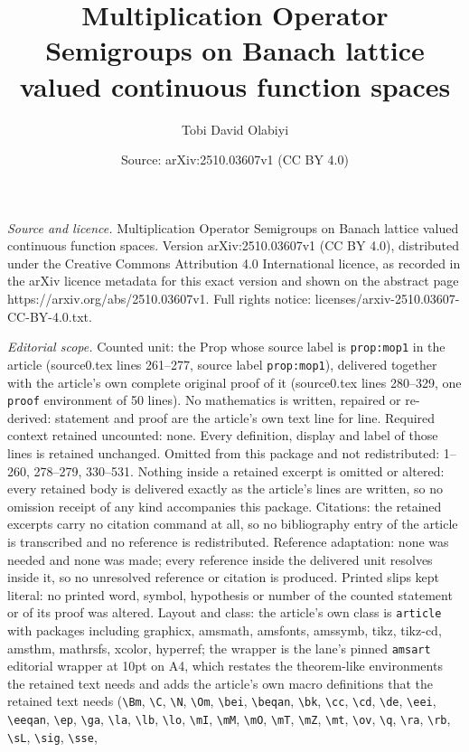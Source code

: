 \documentclass[10pt,a4paper]{amsart}
\title[Multiplication Operator Semigroups on Banach lattice valued ]{Multiplication Operator Semigroups on Banach lattice valued continuous function spaces}
\author{Tobi David Olabiyi}
\date{Source: arXiv:2510.03607v1 (CC BY 4.0)}
\begin{document}
\maketitle

\noindent\emph{Source and licence.} Multiplication Operator Semigroups on Banach lattice valued continuous function spaces. Version arXiv:2510.03607v1 (CC BY 4.0), distributed under the Creative Commons Attribution 4.0 International licence, as recorded in the arXiv licence metadata for this exact version and shown on the abstract page https://arxiv.org/abs/2510.03607v1. Full rights notice: licenses/arxiv-2510.03607-CC-BY-4.0.txt.\par\smallskip

\noindent\textit{Editorial scope.} Counted unit: the Prop whose source label is \texttt{prop:mop1} in the article (source0.tex lines 261--277, source label \texttt{prop:mop1}), delivered together with the article's own complete original proof of it (source0.tex lines 280--329, one \texttt{proof} environment of 50 lines). No mathematics is written, repaired or re-derived: statement and proof are the article's own text line for line. Required context retained uncounted: none. Every definition, display and label of those lines is retained unchanged. Omitted from this package and not redistributed: 1--260, 278--279, 330--531. Nothing inside a retained excerpt is omitted or altered: every retained body is delivered exactly as the article's lines are written, so no omission receipt of any kind accompanies this package. Citations: the retained excerpts carry no citation command at all, so no bibliography entry of the article is transcribed and no reference is redistributed. Reference adaptation: none was needed and none was made; every reference inside the delivered unit resolves inside it, so no unresolved reference or citation is produced. Printed slips kept literal: no printed word, symbol, hypothesis or number of the counted statement or of its proof was altered. Layout and class: the article's own class is \texttt{article} with packages including graphicx, amsmath, amsfonts, amssymb, tikz, tikz-cd, amsthm, mathrsfs, xcolor, hyperref; the wrapper is the lane's pinned \texttt{amsart} editorial wrapper at 10pt on A4, which restates the theorem-like environments the retained text needs and adds the article's own macro definitions that the retained text needs (\texttt{\textbackslash Bm}, \texttt{\textbackslash C}, \texttt{\textbackslash N}, \texttt{\textbackslash Om}, \texttt{\textbackslash bei}, \texttt{\textbackslash beqan}, \texttt{\textbackslash bk}, \texttt{\textbackslash cc}, \texttt{\textbackslash cd}, \texttt{\textbackslash de}, \texttt{\textbackslash eei}, \texttt{\textbackslash eeqan}, \texttt{\textbackslash ep}, \texttt{\textbackslash ga}, \texttt{\textbackslash la}, \texttt{\textbackslash lb}, \texttt{\textbackslash lo}, \texttt{\textbackslash mI}, \texttt{\textbackslash mM}, \texttt{\textbackslash mO}, \texttt{\textbackslash mT}, \texttt{\textbackslash mZ}, \texttt{\textbackslash mt}, \texttt{\textbackslash ov}, \texttt{\textbackslash q}, \texttt{\textbackslash ra}, \texttt{\textbackslash rb}, \texttt{\textbackslash sL}, \texttt{\textbackslash sig}, \texttt{\textbackslash sse}, 
\end{document}
